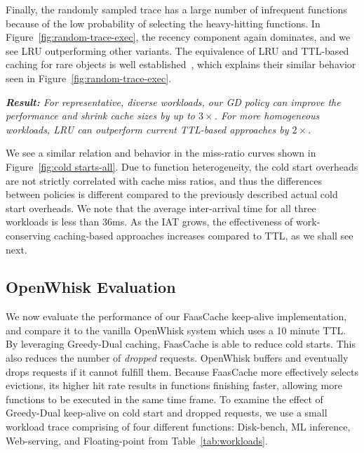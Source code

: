 Finally, the randomly sampled trace has a large number of infrequent functions because of the low probability of selecting the heavy-hitting functions.
In Figure~\ref{fig:random-trace-exec}, the recency component again dominates, and we see LRU outperforming other variants. 
The equivalence of LRU and TTL-based caching for rare objects is well established~\cite{basu2017adaptive,jiang2018convergence}, which explains their similar behavior seen in Figure~\ref{fig:random-trace-exec}. 

\noindent \emph{\textbf{Result:} For representative, diverse workloads, our GD policy can improve the performance and shrink cache sizes by up to $3\times$. For more homogeneous workloads, LRU can outperform current TTL-based approaches by $2\times$.}

We see a similar relation and behavior in the miss-ratio curves shown in Figure~\ref{fig:cold starts-all}.
Due to function heterogeneity, the cold start overheads are not strictly correlated with cache miss ratios, and thus the differences between policies is different compared to the previously described actual cold start overheads. 
We note that the average inter-arrival time for all three workloads is less than 36ms. As the IAT grows, the effectiveness of work-conserving caching-based approaches increases compared to TTL, as we shall see next. 

\subsection{OpenWhisk Evaluation}
\vspace*{\subsecspace}

We now evaluate the performance of our FaasCache keep-alive implementation, and compare it to the vanilla OpenWhisk system which uses a 10 minute TTL. 
By leveraging Greedy-Dual caching, FaasCache is able to reduce cold starts. 
This also reduces the number of \emph{dropped} requests. %
OpenWhisk buffers and eventually drops requests if it cannot fulfill them.
Because FaasCache more effectively selects evictions, its higher hit rate results in functions finishing faster, allowing more functions to be executed in the same time frame.  
%
To examine the effect of Greedy-Dual keep-alive on cold start and dropped requests, we use a small workload trace comprising of four different functions: Disk-bench, ML inference, Web-serving, and Floating-point from Table~\ref{tab:workloads}.

